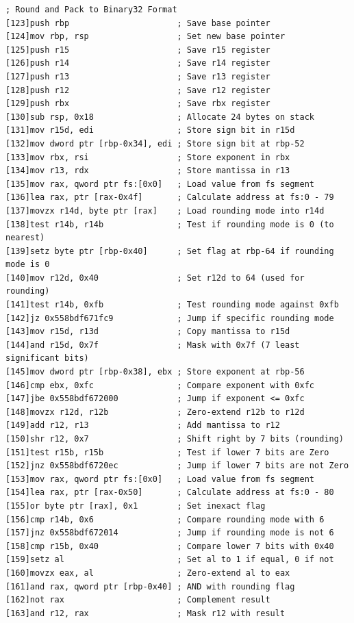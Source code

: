 \documentclass[12pt,letter]{article}
\begin{document}
\begin{lstlisting}[style=rust, caption={Annotated Binary32 Normal Case Subtraction Instruction Trace}, label={fig:ieee_subtract}]
; Round and Pack to Binary32 Format
[123]push rbp                      ; Save base pointer
[124]mov rbp, rsp                  ; Set new base pointer
[125]push r15                      ; Save r15 register
[126]push r14                      ; Save r14 register
[127]push r13                      ; Save r13 register
[128]push r12                      ; Save r12 register
[129]push rbx                      ; Save rbx register
[130]sub rsp, 0x18                 ; Allocate 24 bytes on stack
[131]mov r15d, edi                 ; Store sign bit in r15d
[132]mov dword ptr [rbp-0x34], edi ; Store sign bit at rbp-52
[133]mov rbx, rsi                  ; Store exponent in rbx
[134]mov r13, rdx                  ; Store mantissa in r13
[135]mov rax, qword ptr fs:[0x0]   ; Load value from fs segment
[136]lea rax, ptr [rax-0x4f]       ; Calculate address at fs:0 - 79
[137]movzx r14d, byte ptr [rax]    ; Load rounding mode into r14d
[138]test r14b, r14b               ; Test if rounding mode is 0 (to nearest)
[139]setz byte ptr [rbp-0x40]      ; Set flag at rbp-64 if rounding mode is 0
[140]mov r12d, 0x40                ; Set r12d to 64 (used for rounding)
[141]test r14b, 0xfb               ; Test rounding mode against 0xfb
[142]jz 0x558bdf671fc9             ; Jump if specific rounding mode
[143]mov r15d, r13d                ; Copy mantissa to r15d
[144]and r15d, 0x7f                ; Mask with 0x7f (7 least significant bits)
[145]mov dword ptr [rbp-0x38], ebx ; Store exponent at rbp-56
[146]cmp ebx, 0xfc                 ; Compare exponent with 0xfc
[147]jbe 0x558bdf672000            ; Jump if exponent <= 0xfc
[148]movzx r12d, r12b              ; Zero-extend r12b to r12d
[149]add r12, r13                  ; Add mantissa to r12
[150]shr r12, 0x7                  ; Shift right by 7 bits (rounding)
[151]test r15b, r15b               ; Test if lower 7 bits are Zero
[152]jnz 0x558bdf6720ec            ; Jump if lower 7 bits are not Zero
[153]mov rax, qword ptr fs:[0x0]   ; Load value from fs segment
[154]lea rax, ptr [rax-0x50]       ; Calculate address at fs:0 - 80
[155]or byte ptr [rax], 0x1        ; Set inexact flag
[156]cmp r14b, 0x6                 ; Compare rounding mode with 6
[157]jnz 0x558bdf672014            ; Jump if rounding mode is not 6
[158]cmp r15b, 0x40                ; Compare lower 7 bits with 0x40
[159]setz al                       ; Set al to 1 if equal, 0 if not
[160]movzx eax, al                 ; Zero-extend al to eax
[161]and rax, qword ptr [rbp-0x40] ; AND with rounding flag
[162]not rax                       ; Complement result
[163]and r12, rax                  ; Mask r12 with result

\end{lstlisting}
\end{document}

